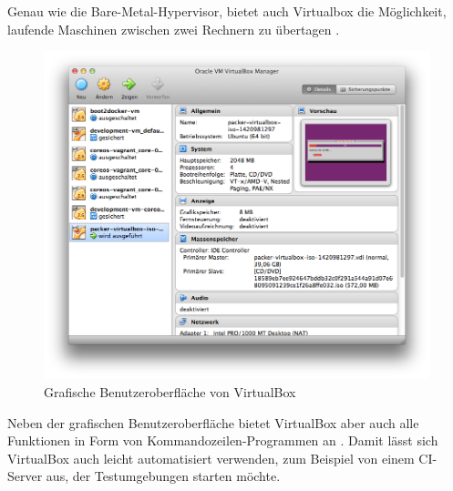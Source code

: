 Genau wie die Bare-Metal-Hypervisor, bietet auch Virtualbox die Möglichkeit, laufende Maschinen zwischen zwei Rechnern zu übertagen \citep[Vgl.][S. 111]{Oracle14}.

\begin{figure}[!ht]
  \begin{center}
    \includegraphics[width=14cm]{bilder/virtualbox-gui.png}
    \caption{Grafische Benutzeroberfläche von VirtualBox}
  \end{center}
\end{figure}

Neben der grafischen Benutzeroberfläche bietet VirtualBox aber auch alle Funktionen in Form von Kommandozeilen-Programmen an \citep[Vgl.][S. 113]{Oracle14}. Damit lässt sich VirtualBox auch leicht automatisiert verwenden, zum Beispiel von einem \ac{CI}-Server aus, der Testumgebungen starten möchte.


